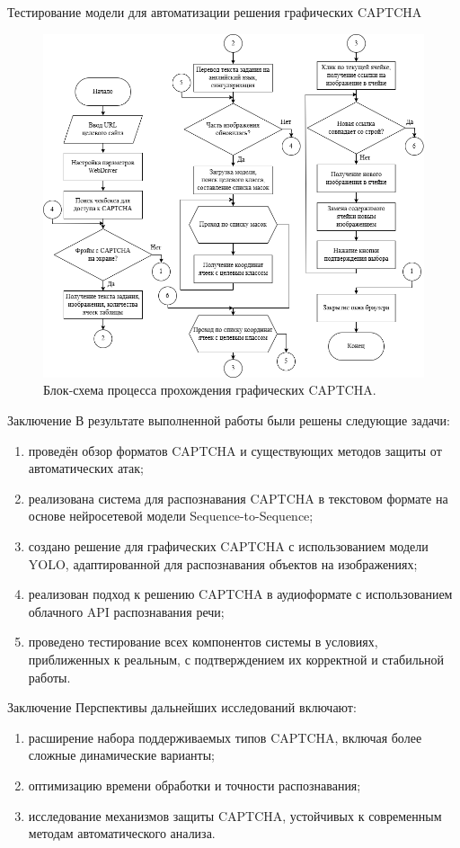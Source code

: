 \documentclass[12pt,a4paper,mathserif]{beamer}
\begin{document}
\begin{frame}{\footnotesize Тестирование модели для автоматизации решения графических CAPTCHA}
    \begin{figure}
        \centering
        \includegraphics[width=0.6\linewidth]{imgs/solve_captcha_flow.png}
        \caption{\centering Блок-схема процесса прохождения графических CAPTCHA.}
    \end{figure}
\end{frame}

\begin{frame}{Заключение}
    \setlength{\parindent}{0.5cm}
    В результате выполненной работы были решены следующие задачи:

    \begin{enumerate}
        \item проведён обзор форматов CAPTCHA и существующих методов защиты от 
        автоматических атак;
        \item реализована система для распознавания CAPTCHA в текстовом формате 
        на основе нейросетевой модели Sequence-to-Sequence;
        \item создано решение для графических CAPTCHA с использованием модели 
        YOLO, адаптированной для распознавания объектов на изображениях;
        \item реализован подход к решению CAPTCHA в аудиоформате с использованием 
        облачного API распознавания речи;
        \item проведено тестирование всех компонентов системы в условиях, 
        приближенных к реальным, с подтверждением их корректной и стабильной 
        работы.
    \end{enumerate}
\end{frame}

\begin{frame}{Заключение}
    \setlength{\parindent}{0.5cm}
    Перспективы дальнейших исследований включают:

    \begin{enumerate}
        \item расширение набора поддерживаемых типов CAPTCHA, включая более 
        сложные динамические варианты;
        \item оптимизацию времени обработки и точности распознавания;
        \item исследование механизмов защиты CAPTCHA, устойчивых к современным 
        методам автоматического анализа.
    \end{enumerate}
\end{frame}
\end{document}
